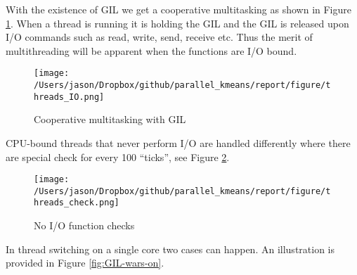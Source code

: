 \documentclass[a0paper,smallertitle]{HYposter}
\begin{document}
With the existence
of GIL we get a cooperative multitasking as shown in Figure \ref{fig:Cooperative-multitasking-with}.
When a thread is running it is holding the GIL and the GIL is released
upon I/O commands such as read, write, send, receive etc. Thus the
merit of multithreading will be apparent when the functions are I/O
bound. 

\begin{figure}[H] 
\texttt{[image: /Users/jason/Dropbox/github/parallel\_kmeans/report/figure/threads\_IO.png]}
\caption{Cooperative multitasking with GIL} \label{fig:Cooperative-multitasking-with}
\end{figure}

CPU-bound threads that never perform I/O are handled differently where
there are special check for every 100 ``ticks'', see Figure \ref{fig:No-I/O-function}.

\begin{figure}[H] 
\texttt{[image: /Users/jason/Dropbox/github/parallel\_kmeans/report/figure/threads\_check.png]}
\caption{No I/O function checks}
\label{fig:No-I/O-function}
\end{figure}

In thread switching on a single core two cases can happen. %
An illustration is provided in Figure \ref{fig:GIL-wars-on}.
\end{document}
